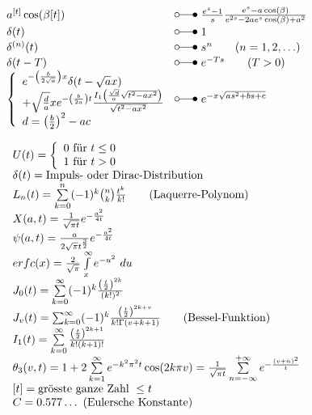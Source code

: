 \begin{footnotesize}
\[\begin{array}{@{}l@{ ~ \laplace ~ }l@{}}
a^{[t]} \cos(\beta [t]) &
    \frac{e^s - 1}{s} \frac{e^s - a \cos(\beta)}{e^{2s} - 2 a e^s \cos(\beta) + a^2} \\
\delta(t) &
    1 \\
\delta^{(n)}(t) &
    s^n \qquad (n = 1, 2, \ldots) \\
\delta(t - T) &
    e^{-Ts} \qquad (T > 0) \\
\left\lbrace\begin{array}{l}
e^{-\left(\frac{b}{2 \sqrt{a}}\right) x} \delta(t - \sqrt{a} x) \\
+ \sqrt{\frac{d}{a}} x e^{-\left(\frac{b}{2a}\right) t} \frac{I_1 \left(\frac{\sqrt{d}}{a} \sqrt{t^2 - a x^2}\right)}{\sqrt{t^2 - a x^2}} \\
d = \left(\frac{b}{2}\right)^2 - a c \\
\end{array}\right. &
    e^{-x \sqrt{as^2 + bs + c}} \\
\end{array} \]

\[ \begin{array}{@{}l@{}}
U(t) = 
    \left\lbrace\begin{array}{l}
    0 \text{ für } t \leq 0 \\
    1 \text{ für } t > 0 \\
    \end{array}\right. \\
\delta(t) = 
    \text{Impuls- oder Dirac-Distribution} \\
L_n(t) = 
    \sum\limits_{k=0}^n (-1)^k \binom{n}{k} \frac{t^k}{k!} \qquad \text{(Laquerre-Polynom)} \\
X(a, t) = 
    \frac{1}{\sqrt{\pi t}} e^{-\frac{a^2}{4t}} \\
\psi(a, t) = 
    \frac{a}{2 \sqrt{\pi} t^{\frac{3}{2}}} e^{-\frac{a^2}{4t}} \\
erfc(x) = 
    \frac{2}{\sqrt{\pi}} \int\limits_x^\infty e^{-u^2} ~ du \\
J_0(t) = 
    \sum\limits_{k=0}^{\infty} (-1)^k \frac{\left(\frac{t}{2}\right)^{2k}}{(k!)^2} \\
J_v(t) = 
    \sum_{k=0}^{\infty} (-1)^k \frac{\left(\frac{t}{2}\right)^{2k + v}}{k! \Gamma(v + k + 1)} \qquad \text{(Bessel-Funktion)} \\
I_1(t) = 
    \sum\limits_{k=0}^{\infty} \frac{\left(\frac{t}{2}\right)^{2k + 1}}{k! (k + 1)!} \\
\theta_3(v, t) = 
    1 + 2 \sum\limits_{k=1}^{\infty} e^{-k^2 \pi^2 t} \cos(2 k \pi v) = 
    \frac{1}{\sqrt{\pi t}} \sum\limits_{n=-\infty}^{+\infty} e^{-\frac{(v + n)^2}{t}} \\
{[t]} = 
    \text{grösste ganze Zahl } \leq t \\
C = 
    0.577\ldots \text{ (Eulersche Konstante)} \\
\end{array} \]
\end{footnotesize}

